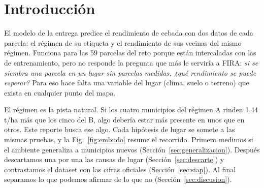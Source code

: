 \section{Introducción}\label{sec:intro}

El modelo de la entrega predice el rendimiento de cebada con dos datos de cada parcela: el régimen de su etiqueta y
el rendimiento de sus vecinas del mismo régimen. Funciona para las 59 parcelas del reto porque están intercaladas con
las de entrenamiento, pero no responde la pregunta que más le serviría a FIRA: \emph{si se siembra una parcela en un
lugar sin parcelas medidas, ¿qué rendimiento se puede esperar?} Para eso hace falta una variable del lugar (clima,
suelo o terreno) que exista en cualquier punto del mapa.

El régimen es la pista natural. Si los cuatro municipios del régimen A rinden 1.44\,t/ha más que los cinco del B,
algo debería estar más presente en unos que en otros. Este reporte busca ese algo. Cada hipótesis de lugar se somete
a las mismas pruebas, y la Fig.~\ref{fig:embudo} resume el recorrido. Primero medimos si el ambiente generaliza a
municipios nuevos (Sección~\ref{sec:generalizacion}). Después descartamos una por una las causas de lugar
(Sección~\ref{sec:descarte}) y contrastamos el dataset con las cifras oficiales (Sección~\ref{sec:siap}). Al final
separamos lo que podemos afirmar de lo que no (Sección~\ref{sec:discusion}).

